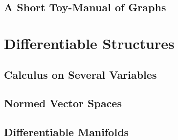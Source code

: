 \chapter{A Short Toy-Manual of Graphs}







\part{Differentiable Structures}

\chapter{Calculus on Several Variables}







\chapter{Normed Vector Spaces}



\chapter{Differentiable Manifolds}




\backmatter

\printbibliography


